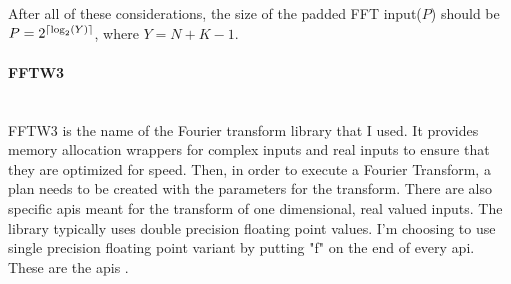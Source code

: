 \vspace{5mm}
After all of these considerations, the size of the padded FFT input($P$) should be $P = 2^{\lceil\log_2(Y)\rceil}$, where $Y = N + K - 1$.

\paragraph{FFTW3} \hspace{0pt} \\
\indent FFTW3 is the name of the Fourier transform library that I used. It provides memory allocation wrappers for complex inputs and real inputs to ensure that they are optimized for speed. Then, in order to execute a Fourier Transform, a plan needs to be created with the parameters for the transform. There are also specific \glspl{api} meant for the transform of one dimensional, real valued inputs. The library typically uses double precision floating point values. I'm choosing to use single precision floating point variant by putting "f" on the end of every \gls{api}. These are the \glspl{api} \citep{fftw3}.


